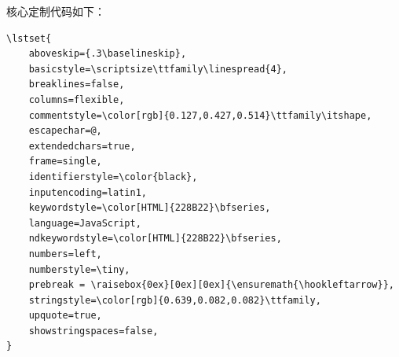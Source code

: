 \documentclass[10pt]{ctexart}
\begin{document}
\clearpage

核心定制代码如下：
\small
\begin{verbatim}
\lstset{
    aboveskip={.3\baselineskip},
    basicstyle=\scriptsize\ttfamily\linespread{4},
    breaklines=false,
    columns=flexible,
    commentstyle=\color[rgb]{0.127,0.427,0.514}\ttfamily\itshape,
    escapechar=@,
    extendedchars=true,
    frame=single,
    identifierstyle=\color{black},
    inputencoding=latin1,
    keywordstyle=\color[HTML]{228B22}\bfseries,
    language=JavaScript,
    ndkeywordstyle=\color[HTML]{228B22}\bfseries,
    numbers=left,
    numberstyle=\tiny,
    prebreak = \raisebox{0ex}[0ex][0ex]{\ensuremath{\hookleftarrow}},
    stringstyle=\color[rgb]{0.639,0.082,0.082}\ttfamily,
    upquote=true,
    showstringspaces=false,
}
\end{verbatim}

%
\end{document}
